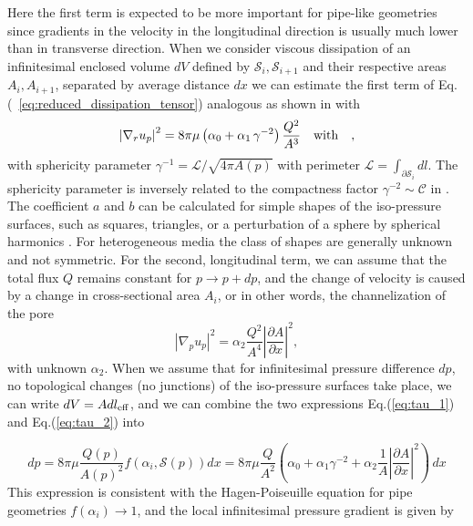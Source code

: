 \documentclass[draft]{agujournal2019}
\begin{document}
Here the first term is expected to be more important for pipe-like geometries since gradients in the velocity in the longitudinal direction is usually much lower than in transverse direction. When we consider viscous dissipation of an infinitesimal enclosed volume $dV$ defined by $\mathcal{S}_i,\mathcal{S}_{i+1}$ and their respective areas $A_i, A_{i+1}$, separated by average distance $dx$ we can estimate the first term of Eq.(~\ref{eq:reduced_dissipation_tensor}) analogous as shown in \cite{mortensen_reexamination_2005} with
\begin{equation}
	\left|\nabla_r u_p\right|^2 =8\pi\mu \left(\alpha_0+\alpha_1\,\gamma^{-2}\right)\frac{ Q^2}{A^3}~~~ \rm{with}~~~ ,\label{eq:tau_1}
\end{equation}
with sphericity parameter $\gamma^{-1} = \mathcal{L}/\sqrt{ 4\pi A(p)}$ with perimeter $\mathcal{L} = \int_{\partial \mathcal{S}_i}dl$. The sphericity parameter is inversely related to the compactness factor $\gamma^{-2}\sim \mathcal{C}$ in \cite{mortensen_reexamination_2005}. The coefficient $a$ and $b$ can be calculated for simple shapes of the iso-pressure surfaces, such as squares, triangles, or a perturbation of a sphere by spherical harmonics . For heterogeneous media the class of shapes are generally unknown and not symmetric. For the second, longitudinal term, we can assume that the total flux $Q$ remains constant for $p\rightarrow p+dp$, and the change of velocity is caused by a change in cross-sectional area $A_i$, or in other words, the channelization of the pore 
\begin{equation}
	\left|\nabla_p u_p\right|^2 = \alpha_2  \frac{Q^2}{A^4}\left|\frac{\partial A}{\partial x }\right|^2,\label{eq:tau_2}
\end{equation}
with unknown $\alpha_2$. When we assume that for infinitesimal pressure difference $dp$, no topological changes (no junctions) of the iso-pressure surfaces take place, we can write $dV = A dl_{\rm{eff}}$, and we can combine the two expressions Eq.(\ref{eq:tau_1}) and Eq.(\ref{eq:tau_2}) into

\begin{equation}
	dp = 8\pi \mu \frac{Q(p)}{A(p)^2} f\left(\alpha_i,\mathcal{S}(p) \right) dx= 8 \pi \mu\frac{Q}{A^2}\left(\alpha_0+\alpha_1\gamma^{-2} + \alpha_2 \frac{1}{A}\left|\frac{\partial A}{\partial x}\right|^2\right)\,dx\label{eq:infi_dp}
\end{equation}
This expression is consistent with the Hagen-Poiseuille equation for pipe geometries $f(\alpha_i)\rightarrow 1$, and the local infinitesimal pressure gradient is given by 
\end{document}
